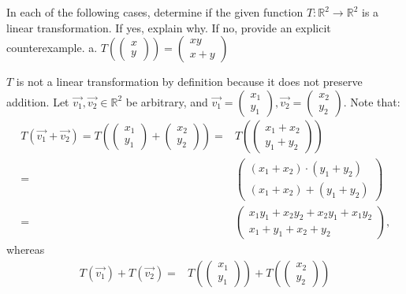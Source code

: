 \documentclass[12pt]{article}
\newenvironment{problem}[2][Problem]
{
	\begin{trivlist} 
		\item[\hskip \labelsep {\bfseries #1 #2:}]
	}
{
	\end{trivlist}
	}
\newenvironment{solution}[1][Solution]
{
	\begin{trivlist} 
		\item[\hskip \labelsep {\itshape #1:}]
	}
	{
	\end{trivlist}
}
\begin{document}
\begin{problem}{1}
In each of the following cases, determine if the given function $T:\mathbb{R}^2 \to \mathbb{R}^2$ is a linear transformation. If yes, explain why. If no, provide an explicit counterexample.
\noindent
\newline
\newline
a. $T \left( \begin{pmatrix} x \\ y\end{pmatrix} \right) = \begin{pmatrix} xy \\ x+y\end{pmatrix}$
\begin{solution}
$T$ is not a linear transformation by definition because it does not preserve addition. Let $\vec{v_{1}},\vec{v_{2}} \in \mathbb{R}^2$ be arbitrary, and $\vec{v_{1}} = \begin{pmatrix} x_{1} \\ y_{1} \end{pmatrix}, \vec{v_{2}} =\begin{pmatrix} x_{2} \\ y_{2} \end{pmatrix}$. Note that:
\begin{align*}
T \left( \vec{v_{1}} + \vec{v_{2}} \right) = T \left(\begin{pmatrix} x_{1} \\ y_{1} \end{pmatrix} + \begin{pmatrix} x_{2} \\ y_{2} \end{pmatrix} \right) =&T \left(\begin{pmatrix} x_{1} + x_{2} \\ y_{1} + y_{2} \end{pmatrix} \right)\\
=& \begin{pmatrix} (x_{1} + x_{2})\cdot (y_{1} + y_{2}) \\(x_{1} + x_{2}) + (y_{1} + y_{2})\end{pmatrix}\\
=& \begin{pmatrix} x_{1}y_{1} + x_{2}y_{2} + x_{2}y_{1} + x_{1}y_{2} \\ x_{1} + y_{1} + x_{2} + y_{2} \end{pmatrix} \text{,}
\end{align*}
whereas
\begin{align*}
T \left( \vec{v_{1}} \right) +T \left( \vec{v_{2}} \right)=& T \left(\begin{pmatrix} x_{1} \\ y_{1} \end{pmatrix}\right) + T \left(\begin{pmatrix} x_{2} \\ y_{2} \end{pmatrix} \right) \\

\end{align*}
\end{solution}
\end{problem}
\end{document}
